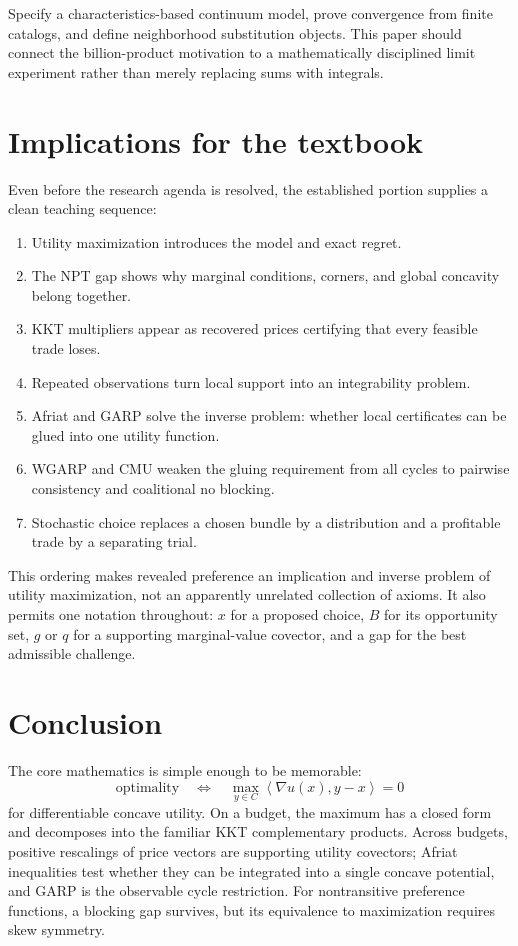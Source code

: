 \documentclass[11pt]{article}
\newcommand{\ip}[2]{\left\langle #1,#2\right\rangle}
\theoremstyle{definition}
\theoremstyle{remark}
\begin{document}
Specify a characteristics-based continuum model, prove convergence from finite catalogs, and define
neighborhood substitution objects.  This paper should connect the billion-product motivation to a
mathematically disciplined limit experiment rather than merely replacing sums with integrals.

\section{Implications for the textbook}

Even before the research agenda is resolved, the established portion supplies a clean teaching
sequence:

\begin{enumerate}
  \item Utility maximization introduces the model and exact regret.
  \item The NPT gap shows why marginal conditions, corners, and global concavity belong together.
  \item KKT multipliers appear as recovered prices certifying that every feasible trade loses.
  \item Repeated observations turn local support into an integrability problem.
  \item Afriat and GARP solve the inverse problem: whether local certificates can be glued into one
  utility function.
  \item WGARP and CMU weaken the gluing requirement from all cycles to pairwise consistency and
  coalitional no blocking.
  \item Stochastic choice replaces a chosen bundle by a distribution and a profitable trade by a
  separating trial.
\end{enumerate}

This ordering makes revealed preference an implication and inverse problem of utility maximization,
not an apparently unrelated collection of axioms.  It also permits one notation throughout:
$x$ for a proposed choice, $B$ for its opportunity set, $g$ or $q$ for a supporting marginal-value
covector, and a gap for the best admissible challenge.

\section{Conclusion}

The core mathematics is simple enough to be memorable:
\[
\text{optimality}
\quad\Longleftrightarrow\quad
\max_{y\in C}\ip{\nabla u(x)}{y-x}=0
\]
for differentiable concave utility.  On a budget, the maximum has a closed form and decomposes into
the familiar KKT complementary products.  Across budgets, positive rescalings of price vectors are
supporting utility covectors; Afriat inequalities test whether they can be integrated into a single
concave potential, and GARP is the observable cycle restriction.  For nontransitive preference
functions, a blocking gap survives, but its equivalence to maximization requires skew symmetry.
\end{document}

